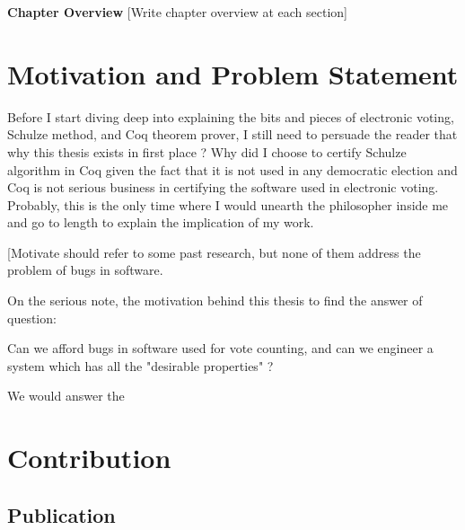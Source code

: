  
\textbf{Chapter Overview}
[Write chapter overview at each section]


\section{Motivation and Problem Statement}
	      
  Before I start diving deep into explaining the bits and pieces 
  of electronic voting, Schulze method, and Coq theorem prover, 
  I still need to persuade the reader that why this thesis 
  exists in first place ?  Why did I choose to certify Schulze 
  algorithm in Coq given the fact that it is not used in 
  any democratic election and Coq is not serious business
  in certifying the software used in electronic voting.  
  Probably, this is the only time where I would unearth 
  the philosopher inside me and go to length to explain 
  the implication of my work. 
  
  
       
%   
  [Motivate should refer to some past research, but none of 
  them address the problem of bugs in software.  
  
  On the serious note, the motivation
  behind this thesis to find the answer of question:  
  
  Can we afford bugs in software used for vote counting, and 
  can we engineer a system which has all the "desirable properties" ?
  
  We would answer the 
  
    
      
 

\section{Contribution}

	\subsection{Publication}

